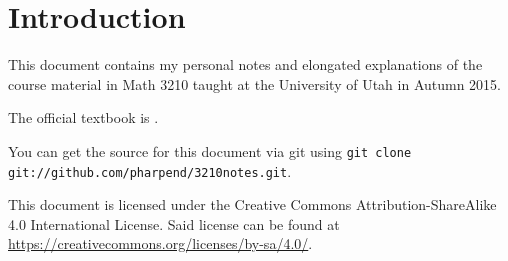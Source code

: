 \chapter{Introduction}

This document contains my personal notes and elongated explanations of the
course material in Math 3210 taught at the University of Utah in Autumn 2015.

The official textbook is \textbf{}.

You can get the source for this document via git using \texttt{git clone
  git://github.com/pharpend/3210notes.git}.

This document is licensed under the Creative Commons Attribution-ShareAlike 4.0
International License. Said license can be found at
\url{https://creativecommons.org/licenses/by-sa/4.0/}.

